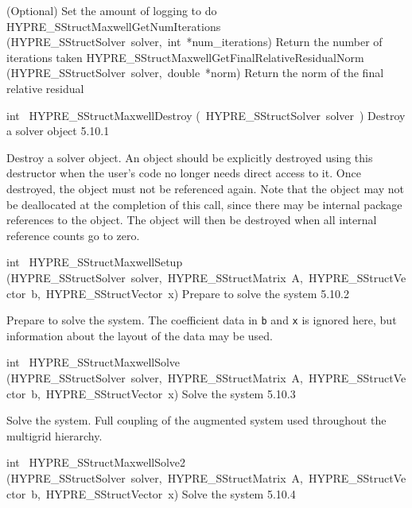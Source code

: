\documentclass{article}
\begin{document}
\begin{cxxentry}
\begin{cxxentry}
\begin{cxxnames}
        {
(Optional) Set the amount of logging to do}
        {}
\label{cxx.5.10.18}
        {HYPRE\_SStructMaxwellGetNumIterations}
        {(HYPRE\_SStructSolver\ solver,\ int\ *num\_iterations)}
        {
Return the number of iterations taken}
        {}
\label{cxx.5.10.19}
        {HYPRE\_SStructMaxwellGetFinalRelativeResidualNorm}
        {(HYPRE\_SStructSolver\ solver,\ double\ *norm)}
        {
Return the norm of the final relative residual}
        {}
\label{cxx.5.10.20}
\end{cxxnames}
\begin{cxxfunction}
{int\ }
        {HYPRE\_SStructMaxwellDestroy}
        {(\ HYPRE\_SStructSolver\ solver\ )}
        {
Destroy a solver object}
        {5.10.1}
\begin{cxxdoc}

Destroy a solver object.  An object should be explicitly destroyed
using this destructor when the user's code no longer needs direct
access to it.  Once destroyed, the object must not be referenced
again.  Note that the object may not be deallocated at the
completion of this call, since there may be internal package
references to the object.  The object will then be destroyed when
all internal reference counts go to zero.
\end{cxxdoc}
\end{cxxfunction}
\begin{cxxfunction}
{int\ }
        {HYPRE\_SStructMaxwellSetup}
        {(HYPRE\_SStructSolver\ solver,\ HYPRE\_SStructMatrix\ A,\ HYPRE\_SStructVector\ b,\ HYPRE\_SStructVector\ x)}
        {
Prepare to solve the system}
        {5.10.2}
\begin{cxxdoc}

Prepare to solve the system.  The coefficient data in {\tt b} and {\tt x} is
ignored here, but information about the layout of the data may be used.
\end{cxxdoc}
\end{cxxfunction}
\begin{cxxfunction}
{int\ }
        {HYPRE\_SStructMaxwellSolve}
        {(HYPRE\_SStructSolver\ solver,\ HYPRE\_SStructMatrix\ A,\ HYPRE\_SStructVector\ b,\ HYPRE\_SStructVector\ x)}
        {
Solve the system}
        {5.10.3}
\begin{cxxdoc}

Solve the system. Full coupling of the augmented system used
throughout the multigrid hierarchy.
\end{cxxdoc}
\end{cxxfunction}
\begin{cxxfunction}
{int\ }
        {HYPRE\_SStructMaxwellSolve2}
        {(HYPRE\_SStructSolver\ solver,\ HYPRE\_SStructMatrix\ A,\ HYPRE\_SStructVector\ b,\ HYPRE\_SStructVector\ x)}
        {
Solve the system}
        {5.10.4}
\begin{cxxdoc}


\end{cxxdoc}
\end{cxxfunction}
\end{cxxentry}
\end{cxxentry}
\end{document}
